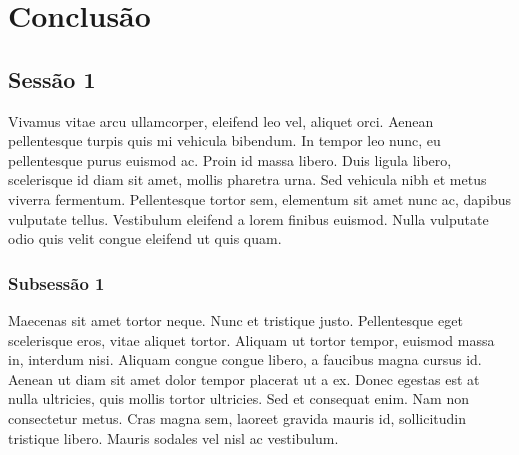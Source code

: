 \chapter{Conclusão} \label{Conclusao}

\section{Sessão 1}
% 

Vivamus vitae arcu ullamcorper, eleifend leo vel, aliquet orci. Aenean pellentesque turpis quis mi vehicula bibendum. In tempor leo nunc, eu pellentesque purus euismod ac. Proin id massa libero. Duis ligula libero, scelerisque id diam sit amet, mollis pharetra urna. Sed vehicula nibh et metus viverra fermentum. Pellentesque tortor sem, elementum sit amet nunc ac, dapibus vulputate tellus. Vestibulum eleifend a lorem finibus euismod. Nulla vulputate odio quis velit congue eleifend ut quis quam.

\subsection{Subsessão 1}

Maecenas sit amet tortor neque. Nunc et tristique justo. Pellentesque eget scelerisque eros, vitae aliquet tortor. Aliquam ut tortor tempor, euismod massa in, interdum nisi. Aliquam congue congue libero, a faucibus magna cursus id. Aenean ut diam sit amet dolor tempor placerat ut a ex. Donec egestas est at nulla ultricies, quis mollis tortor ultricies. Sed et consequat enim. Nam non consectetur metus. Cras magna sem, laoreet gravida mauris id, sollicitudin tristique libero. Mauris sodales vel nisl ac vestibulum.

\clearpage
